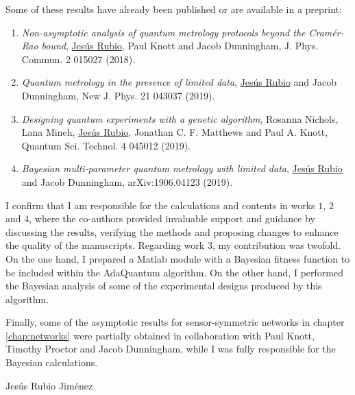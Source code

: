 \documentclass[a4paper,12pt,oneside]{report}
\newcommand\blankpage{
    \null
    \thispagestyle{empty}
    \newpage}
\begin{document}
Some of these results have already been published or are available in a preprint:
\begin{enumerate}
\item \emph{Non-asymptotic analysis of quantum metrology protocols beyond the Cram\'{e}r-Rao bound}, \underline{Jes\'{u}s Rubio}, Paul Knott and Jacob Dunningham, J. Phys. Commun. 2 015027 (2018).
\item \emph{Quantum metrology in the presence of limited data}, \underline{Jes\'{u}s Rubio} and Jacob Dunningham, New J. Phys. 21 043037 (2019).
\item \emph{Designing quantum experiments with a genetic algorithm}, Rosanna Nichols, Lana Mineh, \underline{Jes\'{u}s Rubio}, Jonathan C. F. Matthews and Paul A. Knott, Quantum Sci. Technol. 4 045012 (2019).
\item \emph{Bayesian multi-parameter quantum metrology with limited data}, \underline{Jes\'{u}s Rubio} and Jacob Dunningham, arXiv:1906.04123 (2019).
\end{enumerate}
I confirm that I am responsible for the calculations and contents in works $1$, $2$ and $4$, where the co-authors provided invaluable support and guidance by discussing the results, verifying the methods and proposing changes to enhance the quality of the manuscripts. Regarding work $3$, my contribution was twofold. On the one hand, I prepared a Matlab module with a Bayesian fitness function to be included within the AdaQuantum algorithm. On the other hand, I performed the Bayesian analysis of some of the experimental designs produced by this algorithm. 

Finally, some of the asymptotic results for sensor-symmetric networks in chapter \ref{chap:networks} were partially obtained in collaboration with Paul Knott, Timothy Proctor and Jacob Dunningham, while I was fully responsible for the Bayesian calculations. 

\vskip10mm

\raggedleft Jes\'{u}s Rubio Jim\'{e}nez

\end{document}
